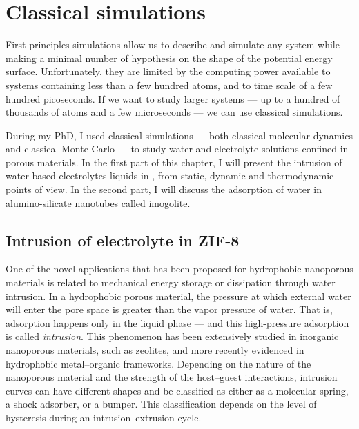 \documentclass[thesis]{subfiles}
\begin{document}
\OnlyInSubfile{\setcounter{chapter}{4}}
\chapter{Classical simulations}
\label{sec:classical}

\baselineskip
First principles simulations allow us to describe and simulate any system while
making a minimal number of hypothesis on the shape of the potential energy
surface. Unfortunately, they are limited by the computing power available to
systems containing less than a few hundred atoms, and to time scale of a few
hundred picoseconds. If we want to study larger systems --- up to a hundred of
thousands of atoms and a few microseconds --- we can use classical simulations.

During my PhD, I used classical simulations --- both classical molecular
dynamics and classical Monte Carlo --- to study water and electrolyte solutions
confined in porous materials. In the first part of this chapter, I will present
the intrusion of water-based electrolytes liquids in , from static, dynamic
and thermodynamic points of view. In the second part, I will discuss the
adsorption of water in alumino-silicate nanotubes called imogolite.

\newpage
\section{Intrusion of electrolyte in ZIF-8}
\label{sec:zif8-intrusion}

One of the novel applications that has been proposed for hydrophobic nanoporous
materials is related to mechanical energy storage or dissipation through water
intrusion\cite{Eroshenko2001, Soulard2004}. In a hydrophobic porous material,
the pressure at which external water will enter the pore space is greater than
the vapor pressure of water. That is, adsorption happens only in the liquid
phase --- and this high-pressure adsorption is called
\emph{intrusion}\cite{Fraux2017}. This phenomenon has been extensively studied
in inorganic nanoporous materials, such as zeolites\cite{Saada2010,
Desbiens2005, Humplik2014a, Humplik2014b}, and more recently evidenced in
hydrophobic metal--organic frameworks\cite{Ortiz2013, Grosu2015,
MichelinJamois2015}. Depending on the nature of the nanoporous material and the
strength of the host--guest interactions, intrusion curves can have different
shapes and be classified as either as a molecular spring, a shock adsorber, or a
bumper. This classification depends on the level of hysteresis during an
intrusion--extrusion cycle.
\end{document}
